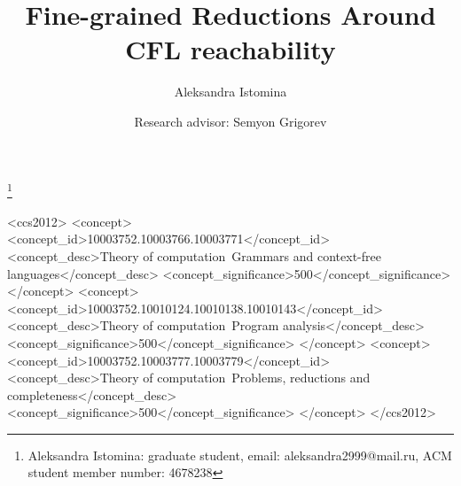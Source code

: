 \documentclass[acmsmall,nonacm]{acmart}
\begin{document}
	
	\title{Fine-grained Reductions Around CFL reachability}
	
	\author{Aleksandra Istomina}
	\thanks{Aleksandra Istomina: graduate student, email: aleksandra2999@mail.ru, ACM student member number: 4678238}
	
	\author{Research advisor: Semyon Grigorev}
	
	\newcommand\todo[1]{{\color{violet}#1}}
	\newcommand\db[1]{{\color{red}#1}}
	\newcommand\question[1]{{\color{cyan}#1}}
	
	
	
	
	\begin{CCSXML}
		<ccs2012>
		<concept>
		<concept_id>10003752.10003766.10003771</concept_id>
		<concept_desc>Theory of computation~Grammars and context-free languages</concept_desc>
		<concept_significance>500</concept_significance>
		</concept>
		<concept>
		<concept_id>10003752.10010124.10010138.10010143</concept_id>
		<concept_desc>Theory of computation~Program analysis</concept_desc>
		<concept_significance>500</concept_significance>
		</concept>
		<concept>
		<concept_id>10003752.10003777.10003779</concept_id>
		<concept_desc>Theory of computation~Problems, reductions and completeness</concept_desc>
		<concept_significance>500</concept_significance>
		</concept>
		</ccs2012>
		\end{CCSXML}
		
\end{document}
